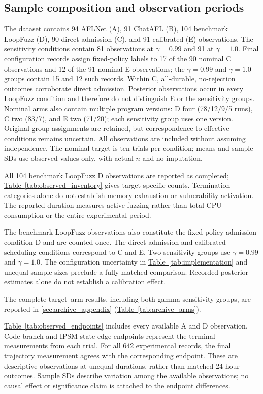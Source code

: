 \documentclass[final,5p,times,number]{elsarticle}
\newcommand{\namedref}[2]{\hyperref[#2]{#1~\ref*{#2}}}
\begin{document}
\subsection{Sample composition and observation periods}
The dataset contains 94 AFLNet (A), 91 ChatAFL (B), 104 benchmark LoopFuzz (D), 90 direct-admission (C), and 91 calibrated (E) observations. The sensitivity conditions contain 81 observations at $\gamma=0.99$ and 91 at $\gamma=1.0$. Final configuration records assign fixed-policy labels to 17 of the 90 nominal C observations and 12 of the 91 nominal E observations; the $\gamma=0.99$ and $\gamma=1.0$ groups contain 15 and 12 such records. Within C, all-durable, no-rejection outcomes corroborate direct admission. Posterior observations occur in every LoopFuzz condition and therefore do not distinguish E or the sensitivity groups. Nominal arms also contain multiple program versions: D four (78/12/9/5 runs), C two (83/7), and E two (71/20); each sensitivity group uses one version. Original group assignments are retained, but correspondence to effective conditions remains uncertain. All observations are included without assuming independence. The nominal target is ten trials per condition; means and sample SDs use observed values only, with actual $n$ and no imputation.

All 104 benchmark LoopFuzz D observations are reported as completed; \namedref{Table}{tab:observed_inventory} gives target-specific counts. Termination categories alone do not establish memory exhaustion or vulnerability activation. The reported duration measures active fuzzing rather than total CPU consumption or the entire experimental period.

The benchmark LoopFuzz observations also constitute the fixed-policy admission condition D and are counted once. The direct-admission and calibrated-scheduling conditions correspond to C and E. Two sensitivity groups use $\gamma=0.99$ and $\gamma=1.0$. The configuration uncertainty in \namedref{Table}{tab:implementation} and unequal sample sizes preclude a fully matched comparison. Recorded posterior estimates alone do not establish a calibration effect.


The complete target--arm results, including both gamma sensitivity groups, are reported in \ref{sec:archive_appendix} (\namedref{Table}{tab:archive_arms}).

\namedref{Table}{tab:observed_endpoints} includes every available A and D observation. Code-branch and IPSM state-edge endpoints represent the terminal measurements from each trial. For all 642 experimental records, the final trajectory measurement agrees with the corresponding endpoint. These are descriptive observations at unequal durations, rather than matched 24-hour outcomes. Sample SDs describe variation among the available observations; no causal effect or significance claim is attached to the endpoint differences.
\end{document}
